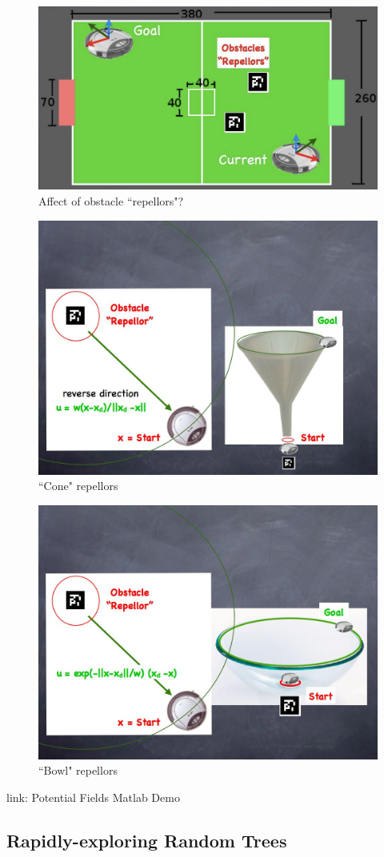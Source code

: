 \begin{figure}[!h]
\centering
\includegraphics[width=0.6\columnwidth]{figures/7_potential6.jpg}
\caption{Affect of obstacle ``repellors"?}
\end{figure}

\begin{figure}[!h]
\centering
\includegraphics[width=0.6\columnwidth]{figures/7_potential7.jpg}
\caption{``Cone" repellors}
\end{figure}

\begin{figure}[!h]
\centering
\includegraphics[width=0.6\columnwidth]{figures/7_potential8.jpg}
\caption{``Bowl" repellors}
\end{figure}

link: Potential Fields Matlab Demo

\subsection{Rapidly-exploring Random Trees}

